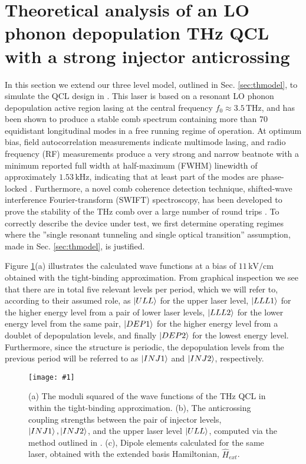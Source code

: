 \documentclass[10pt]{article}
\newcommand{\includegraphicsXL}[1]{\texttt{[image: \#1]}}
\begin{document}
	\section{Theoretical analysis of an LO phonon depopulation THz QCL with a strong injector anticrossing}
	\label{sec:application}
	In this section we extend our three level model, outlined in Sec. \ref{sec:thmodel}, to simulate the QCL design in
	\cite{burghoff2014terahertz}. This laser is based on a resonant LO phonon
	depopulation active region lasing at the central frequency $f_{0}%
	\approx3.5{\,}\mathrm{THz}$, and has been shown to produce a stable comb
	spectrum containing more than 70 equidistant longitudinal modes in a free
	running regime of operation. At optimum bias, field autocorrelation
	measurements indicate multimode lasing, and radio frequency (RF) measurements
	produce a very strong and narrow beatnote with a minimum reported full width
	at half-maximum (FWHM) linewidth of approximately $1.53{\,}\mathrm{kHz}$,
	indicating that at least part of the modes are phase-locked
	\cite{hugi2012mid,burghoff2014terahertz,wienold2014evidence,rosch2015octave}.
	Furthermore, a novel comb coherence detection technique, shifted-wave
	interference Fourier-transform (SWIFT) spectroscopy, has been developed to
	prove the stability of the THz comb over a large number of round trips
	\cite{burghoff2015evaluating}. To correctly describe the device under test, we
	first determine operating regimes where the ''single resonant tunneling and
	single optical transition'' assumption, made in Sec. \ref{sec:thmodel}, is justified.
	
	Figure \ref{fig:img02}(a) illustrates the calculated wave functions at a bias of
	$11{\,}\mathrm{kV}/\mathrm{cm}$ obtained with the tight-binding approximation.
	From graphical inspection we see that there are in total five relevant
	levels per period, which we will refer to, according to their assumed role, as
	$\Ket{ULL}$ for the upper laser level, $\Ket{LLL1}$ for the higher energy
	level from a pair of lower laser levels, $\Ket{LLL2}$ for the lower energy
	level from the same pair, $\Ket{DEP1}$ for the higher energy level from a
	doublet of depopulation levels, and finally $\Ket{DEP2}$ for the lowest energy
	level. Furthermore, since the structure is periodic, the depopulation levels
	from the previous period will be referred to as $\Ket{INJ1}$ and $\Ket{INJ2}$, respectively.
	
	\begin{figure}[h!]
		\begin{center}
			\includegraphicsXL{FL183S.eps}
		\end{center}
		\caption{(a) The moduli squared of the wave functions of the THz QCL
			in \cite{burghoff2014terahertz} within the tight-binding approximation.
			(b), The anticrossing coupling strengths between the pair of injector
			levels, $\ket{INJ1},\ket{INJ2}$, and the upper laser level $\ket{ULL}$,
			computed via the method outlined in \cite{bastard1990wave}. (c), Dipole
			elements calculated for the same laser, obtained with the extended basis
			Hamiltonian, $\hat{H}_{ext}$.}%
		\label{fig:img02}%
	\end{figure}
	
\end{document}
